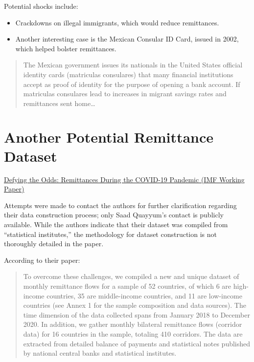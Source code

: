 \documentclass[
  11pt,
]{article}
\providecommand{\tightlist}{%
  \setlength{\itemsep}{0pt}\setlength{\parskip}{0pt}}\usepackage{longtable,booktabs,array}
\begin{document}
Potential shocks include:

\begin{itemize}
\tightlist
\item
  Crackdowns on illegal immigrants, which would reduce remittances.
\item
  Another interesting case is the Mexican Consular ID Card, issued in
  2002, which helped bolster remittances.
\end{itemize}

\begin{quote}
The Mexican government issues its nationals in the United States
official identity cards (matriculas consulares) that many financial
institutions accept as proof of identity for the purpose of opening a
bank account. If matriculas consulares lead to increases in migrant
savings rates and remittances sent home\ldots{}
\end{quote}

\section{Another Potential Remittance
Dataset}\label{another-potential-remittance-dataset}

\href{https://www.imf.org/en/Publications/WP/Issues/2021/07/16/Defying-the-Odds-Remittances-During-the-COVID-19-Pandemic-461321}{Defying
the Odds: Remittances During the COVID-19 Pandemic (IMF Working Paper)}

Attempts were made to contact the authors for further clarification
regarding their data construction process; only Saad Quayyum's contact
is publicly available. While the authors indicate that their dataset was
compiled from ``statistical institutes,'' the methodology for dataset
construction is not thoroughly detailed in the paper.

According to their paper:

\begin{quote}
To overcome these challenges, we compiled a new and unique dataset of
monthly remittance flows for a sample of 52 countries, of which 6 are
high-income countries, 35 are middle-income countries, and 11 are
low-income countries (see Annex 1 for the sample composition and data
sources). The time dimension of the data collected spans from January
2018 to December 2020. In addition, we gather monthly bilateral
remittance flows (corridor data) for 16 countries in the sample,
totaling 410 corridors. The data are extracted from detailed balance of
payments and statistical notes published by national central banks and
statistical institutes.
\end{quote}
\end{document}
